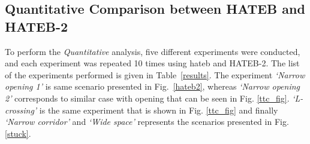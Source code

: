 \subsection{Quantitative Comparison between HATEB and HATEB-2}
To perform the \textit{Quantitative} analysis, five different experiments were conducted, and each experiment was repeated 10 times using \acrshort{hateb} and HATEB-2. The list of the experiments performed is given in Table~\ref{results}. The experiment \textit{`Narrow opening 1'} is same scenario presented in Fig.~\ref{hateb2}, whereas \textit{`Narrow opening 2'} corresponds to similar case with opening that can be seen in Fig. \ref{ttc_fig}. \textit{`L-crossing'} is the same experiment that is shown in Fig. \ref{ttc_fig} and finally \textit{`Narrow corridor'} and \textit{`Wide space'} represents the scenarios presented in Fig. \ref{stuck}. 

